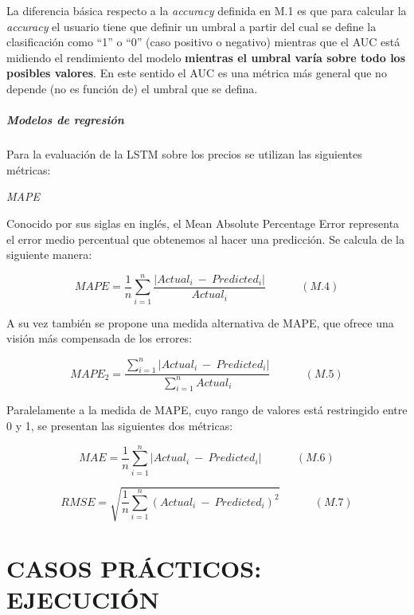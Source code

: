 \documentclass[]{DissertateUSU}
\let\oldparagraph\paragraph
\renewcommand{\paragraph}[1]{\oldparagraph{#1}\mbox{}}
\begin{document}
\noindent La diferencia básica respecto a la \emph{accuracy} definida en
M.1 es que para calcular la \emph{accuracy} el usuario tiene que definir
un umbral a partir del cual se define la clasificación como ``1'' o
``0'' (caso positivo o negativo) mientras que el AUC está midiendo el
rendimiento del modelo \textbf{mientras el umbral varía sobre todo los
posibles valores}. En este sentido el AUC es una métrica más general que
no depende (no es función de) el umbral que se defina.

\setlength\parskip{5ex}

\hypertarget{modelos-de-regresion}{%
\paragraph{Modelos de regresión}\label{modelos-de-regresion}}

\noindent Para la evaluación de la LSTM sobre los precios se utilizan
las siguientes métricas:

\emph{MAPE}

\noindent Conocido por sus siglas en inglés, el Mean Absolute Percentage
Error representa el error medio percentual que obtenemos al hacer una
predicción. Se calcula de la siguiente manera:

\[MAPE = \frac{1}{n}\sum_{i=1}^{n}\frac{\left |  Actual_i \ -\ Predicted_i\right |}{Actual_i} \ \ \ \ \ \ \ \ \ \ \ \ \ \ (M.4)\]

\noindent  A su vez también se propone una medida alternativa de MAPE,
que ofrece una visión más compensada de los errores:

\[MAPE_2 = \frac{\sum_{i=1}^{n}\left |  Actual_i \ -\ Predicted_i\right |}{\sum_{i=1}^{n}Actual_i} \ \ \ \ \ \ \ \ \ \ \ \ \ \ (M.5)\]

\noindent Paralelamente a la medida de MAPE, cuyo rango de valores está
restringido entre 0 y 1, se presentan las siguientes dos métricas:

\[MAE = \frac{1}{n}\sum_{i=1}^{n}\left |  Actual_i \ -\ Predicted_i\right | \ \ \ \ \ \ \ \ \ \ \ \ \ \ (M.6)\]
\setlength\parskip{5ex}

\[RMSE = \sqrt{\frac{1}{n}\sum_{i=1}^{n}(Actual_i \ -\ Predicted_i)^2} \ \ \ \ \ \ \ \ \ \ \ \ \ \ (M.7)\]

\FloatBarrier
\newpage
{}
\fancyhead[R]{\thepage}
\fancyfoot[C]{}

\chapter{\textbf{CASOS PRÁCTICOS: EJECUCIÓN}}
\justifying
\end{document}
